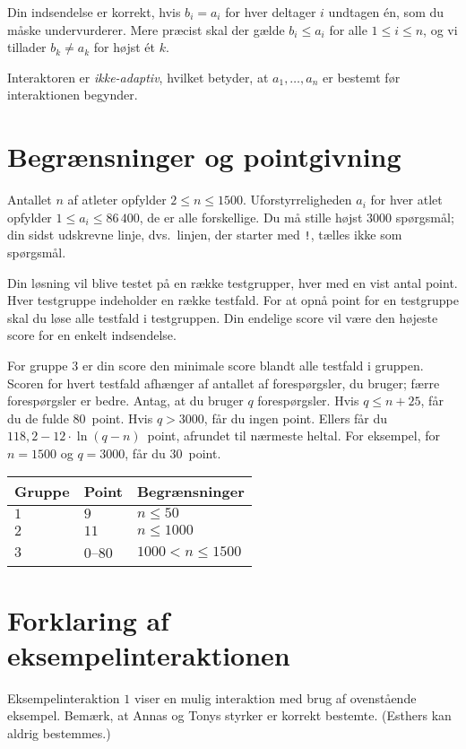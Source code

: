 Din indsendelse er korrekt, hvis $b_i=a_i$ for hver deltager $i$ undtagen én, som du måske undervurderer.
Mere præcist skal der gælde $b_i\leq a_i$ for alle $1\leq i\leq n$, og vi tillader $b_k \neq a_k$ for højst ét $k$.


Interaktoren er \emph{ikke-adaptiv}, hvilket betyder, at $a_1,\ldots, a_n$ er bestemt før interaktionen begynder.

\section*{Begrænsninger og pointgivning}

Antallet $n$ af atleter opfylder
$2\leq n\leq 1500$. %
Uforstyrreligheden $a_i$ for hver atlet opfylder
$1\leq a_i\leq 86\,400$, %
de er alle forskellige. %
Du må stille
højst $3000$ spørgsmål; %
din sidst udskrevne linje, dvs.\ linjen, der starter med \texttt{!}, tælles ikke som spørgsmål.

Din løsning vil blive testet på en række testgrupper, hver med en vist antal point.
Hver testgruppe indeholder en række testfald.
For at opnå point for en testgruppe skal du løse alle testfald i testgruppen.
Din endelige score vil være den højeste score for en enkelt indsendelse.

For gruppe $3$ er din score den minimale score blandt alle testfald i gruppen.
Scoren for hvert testfald afhænger af antallet af forespørgsler, du bruger;
færre forespørgsler er bedre.
Antag, at du bruger $q$ forespørgsler.
Hvis $q \le n+25$, får du de fulde $80$~point.
Hvis $q > 3000$, får du ingen point.
Ellers får du
$118,2 - 12 \cdot \ln(q - n)$~point, afrundet til nærmeste heltal. %
For eksempel, for $n = 1500$ og $q = 3000$, får du $30$~point.

\medskip
\begin{tabular}{lll}
Gruppe & Point & Begrænsninger\\\hline
$1$ & $9$ & $n\leq 50$\\
$2$ & $11$ & $n\leq 1000$\\
$3$ & $0$--$80$ & $1000 < n\leq 1500$
\end{tabular}

\section*{Forklaring af eksempelinteraktionen}

Eksempelinteraktion $1$ viser en mulig interaktion med brug af ovenstående eksempel.
Bemærk, at Annas og Tonys styrker er korrekt bestemte.
(Esthers kan aldrig bestemmes.)
